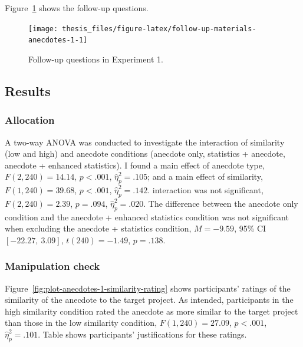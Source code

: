 \documentclass[a4paper, nobind, dvipsnames]{templates/ociamthesis}
\theoremstyle{definition}
\theoremstyle{definition}
\theoremstyle{definition}
\theoremstyle{definition}
\theoremstyle{remark}
\begin{document}
Figure~\ref{fig:follow-up-materials-anecdotes-1} shows the follow-up questions.



\begin{figure}
\texttt{[image: thesis\_files/figure-latex/follow-up-materials-anecdotes-1-1]} \caption{Follow-up questions in Experiment 1.}\label{fig:follow-up-materials-anecdotes-1}
\end{figure}

\hypertarget{results-anecdotes-1-appendix}{%
\subsection{Results}\label{results-anecdotes-1-appendix}}

\hypertarget{allocation-2}{%
\subsubsection{Allocation}\label{allocation-2}}

A two-way ANOVA was conducted to investigate the interaction of similarity (low
and high) and anecdote conditions (anecdote only, statistics + anecdote,
anecdote + enhanced statistics). I found a main effect of anecdote type,
\(F(2, 240) = 14.14\), \(p < .001\), \(\hat{\eta}^2_p = .105\); and a main effect of similarity,
\(F(1, 240) = 39.68\), \(p < .001\), \(\hat{\eta}^2_p = .142\). interaction was not significant,
\(F(2, 240) = 2.39\), \(p = .094\), \(\hat{\eta}^2_p = .020\). The difference between
the anecdote only condition and the anecdote + enhanced statistics condition was
not significant when excluding the anecdote + statistics condition,
\(M = -9.59\), 95\% CI \([-22.27,~3.09]\), \(t(240) = -1.49\), \(p = .138\).

\hypertarget{manipulation-check}{%
\subsubsection{Manipulation check}\label{manipulation-check}}

Figure~\ref{fig:plot-anecdotes-1-similarity-rating} shows participants' ratings
of the similarity of the anecdote to the target project. As intended,
participants in the high similarity condition rated the anecdote as more similar
to the target project than those in the low similarity condition,
\(F(1, 240) = 27.09\), \(p < .001\), \(\hat{\eta}^2_p = .101\). Table shows participants'
justifications for these ratings.
\end{document}
